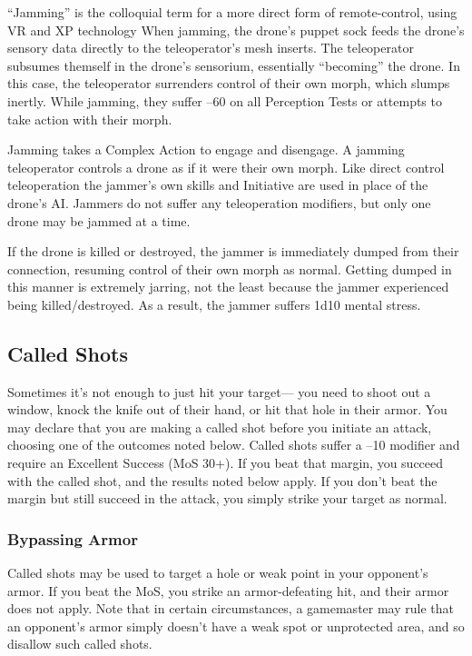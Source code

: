 ``Jamming'' is the colloquial term for a more direct 
form of remote-control, using VR and XP technology
When jamming, the drone's puppet sock feeds
the drone's sensory data directly to the teleoperator's 
mesh inserts. The teleoperator subsumes themself in 
the drone's sensorium, essentially ``becoming'' the 
drone. In this case, the teleoperator surrenders control
of their own morph, which slumps inertly. While
jamming, they suffer –60 on all Perception Tests or 
attempts to take action with their morph.

Jamming takes a Complex Action to engage and 
disengage. A jamming teleoperator controls a drone 
as if it were their own morph. Like direct control teleoperation
the jammer's own skills and Initiative are
used in place of the drone's AI. Jammers do not suffer 
any teleoperation modifiers, but only one drone may 
be jammed at a time.

If the drone is killed or destroyed, the jammer is 
immediately dumped from their connection, resuming 
control of their own morph as normal. Getting dumped 
in this manner is extremely jarring, not the least because
the jammer experienced being killed/destroyed.
As a result, the jammer suffers 1d10 mental stress.

\subsection{Called Shots}


Sometimes it's not enough to just hit your target—
you need to shoot out a window, knock the knife out 
of their hand, or hit that hole in their armor. You may 
declare that you are making a called shot before you 
initiate an attack, choosing one of the outcomes noted 
below. Called shots suffer a –10 modifier and require 
an Excellent Success (MoS 30+). If you beat that 
margin, you succeed with the called shot, and the results
noted below apply. If you don't beat the margin
but still succeed in the attack, you simply strike your 
target as normal.

\subsubsection{Bypassing Armor}

Called shots may be used to target a hole or weak 
point in your opponent's armor. If you beat the MoS, 
you strike an armor-defeating hit, and their armor 
does not apply. Note that in certain circumstances, a 
gamemaster may rule that an opponent's armor simply 
doesn't have a weak spot or unprotected area, and so 
disallow such called shots.

